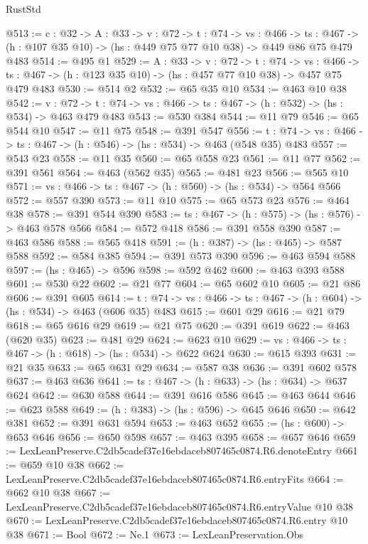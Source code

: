 \begin{lexlean}{RustStd}
\begin{coremodule}
@513 := {c : @32} ->
  {A : @33} ->
  {v : @72} ->
  {t : @74} ->
  {vs : @466} ->
  {ts : @467} -> (h : @107 @35 @10) -> (hs : @449 @75 @77 @10 @38) -> @449 @86 @75 @479 @483
@514 := @495 @1
@529 := {A : @33} ->
  {v : @72} ->
  {t : @74} ->
  {vs : @466} -> {ts : @467} -> (h : @123 @35 @10) -> (hs : @457 @77 @10 @38) -> @457 @75 @479 @483
@530 := @514 @2
@532 := @65 @35 @10
@534 := @463 @10 @38
@542 := {v : @72} ->
  {t : @74} -> {vs : @466} -> {ts : @467} -> (h : @532) -> (hs : @534) -> @463 @479 @483
@543 := @530 @384
@544 := @11 @79
@546 := @65 @544 @10
@547 := @11 @75
@548 := @391 @547
@556 := {t : @74} -> {vs : @466} -> {ts : @467} -> (h : @546) -> (hs : @534) -> @463 (@548 @35) @483
@557 := @543 @23
@558 := @11 @35
@560 := @65 @558 @23
@561 := @11 @77
@562 := @391 @561
@564 := @463 (@562 @35)
@565 := @481 @23
@566 := @565 @10
@571 := {vs : @466} -> {ts : @467} -> (h : @560) -> (hs : @534) -> @564 @566
@572 := @557 @390
@573 := @11 @10
@575 := @65 @573 @23
@576 := @464 @38
@578 := @391 @544 @390
@583 := {ts : @467} -> (h : @575) -> (hs : @576) -> @463 @578 @566
@584 := @572 @418
@586 := @391 @558 @390
@587 := @463 @586
@588 := @565 @418
@591 := (h : @387) -> (hs : @465) -> @587 @588
@592 := @584 @385
@594 := @391 @573 @390
@596 := @463 @594 @588
@597 := (hs : @465) -> @596
@598 := @592 @462
@600 := @463 @393 @588
@601 := @530 @22
@602 := @21 @77
@604 := @65 @602 @10
@605 := @21 @86
@606 := @391 @605
@614 := {t : @74} -> {vs : @466} -> {ts : @467} -> (h : @604) -> (hs : @534) -> @463 (@606 @35) @483
@615 := @601 @29
@616 := @21 @79
@618 := @65 @616 @29
@619 := @21 @75
@620 := @391 @619
@622 := @463 (@620 @35)
@623 := @481 @29
@624 := @623 @10
@629 := {vs : @466} -> {ts : @467} -> (h : @618) -> (hs : @534) -> @622 @624
@630 := @615 @393
@631 := @21 @35
@633 := @65 @631 @29
@634 := @587 @38
@636 := @391 @602 @578
@637 := @463 @636
@641 := {ts : @467} -> (h : @633) -> (hs : @634) -> @637 @624
@642 := @630 @588
@644 := @391 @616 @586
@645 := @463 @644
@646 := @623 @588
@649 := (h : @383) -> (hs : @596) -> @645 @646
@650 := @642 @381
@652 := @391 @631 @594
@653 := @463 @652
@655 := (hs : @600) -> @653 @646
@656 := @650 @598
@657 := @463 @395
@658 := @657 @646
@659 := LexLeanPreserve.C2db5cadef37e16ebdaceb807465c0874.R6.denoteEntry
@661 := @659 @10 @38
@662 := LexLeanPreserve.C2db5cadef37e16ebdaceb807465c0874.R6.entryFits
@664 := @662 @10 @38
@667 := LexLeanPreserve.C2db5cadef37e16ebdaceb807465c0874.R6.entryValue @10 @38
@670 := LexLeanPreserve.C2db5cadef37e16ebdaceb807465c0874.R6.entry @10 @38
@671 := Bool
@672 := Ne.{1}
@673 := LexLeanPreservation.Obs

\end{coremodule}
\end{lexlean}
